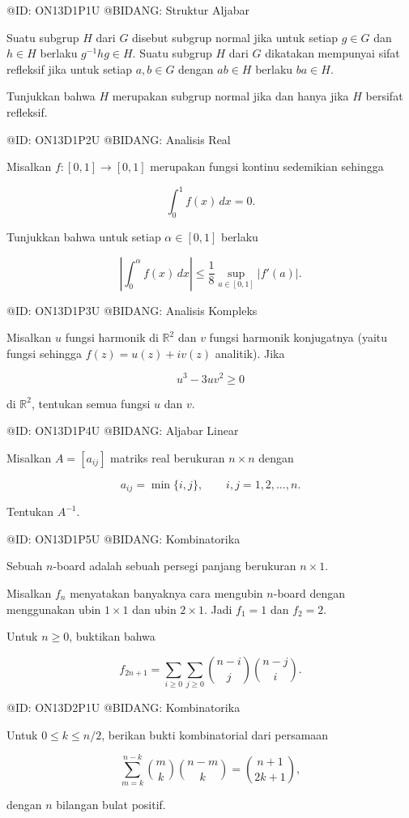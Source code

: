 @ID: ON13D1P1U
@BIDANG: Struktur Aljabar

Suatu subgrup $H$ dari $G$ disebut subgrup normal jika untuk setiap $g\in G$ dan $h\in H$ berlaku $g^{-1}hg\in H$. Suatu subgrup $H$ dari $G$ dikatakan mempunyai sifat refleksif jika untuk setiap $a,b\in G$ dengan $ab\in H$ berlaku $ba\in H$.

Tunjukkan bahwa $H$ merupakan subgrup normal jika dan hanya jika $H$ bersifat refleksif.

@ID: ON13D1P2U
@BIDANG: Analisis Real

Misalkan $f:[0,1]\to[0,1]$ merupakan fungsi kontinu sedemikian sehingga

$$
\int_0^1f(x)\,dx=0.
$$

Tunjukkan bahwa untuk setiap $\alpha\in[0,1]$ berlaku

$$
\left|
\int_0^\alpha f(x)\,dx
\right|
\le
\frac18
\sup_{a\in[0,1]}|f'(a)|.
$$

@ID: ON13D1P3U
@BIDANG: Analisis Kompleks

Misalkan $u$ fungsi harmonik di $\mathbb R^2$ dan $v$ fungsi harmonik konjugatnya (yaitu fungsi sehingga $f(z)=u(z)+iv(z)$ analitik). Jika

$$
u^3-3uv^2\ge0
$$

di $\mathbb R^2$, tentukan semua fungsi $u$ dan $v$.

@ID: ON13D1P4U
@BIDANG: Aljabar Linear

Misalkan $A=[a_{ij}]$ matriks real berukuran $n\times n$ dengan

$$
a_{ij}=\min\{i,j\},
\qquad i,j=1,2,\ldots,n.
$$

Tentukan $A^{-1}$.

@ID: ON13D1P5U
@BIDANG: Kombinatorika

Sebuah $n$-board adalah sebuah persegi panjang berukuran $n\times1$.

Misalkan $f_n$ menyatakan banyaknya cara mengubin $n$-board dengan menggunakan ubin $1\times1$ dan ubin $2\times1$. Jadi $f_1=1$ dan $f_2=2$.

Untuk $n\ge0$, buktikan bahwa

$$
f_{2n+1}
=
\sum_{i\ge0}\sum_{j\ge0}
\binom{n-i}{j}
\binom{n-j}{i}.
$$

@ID: ON13D2P1U
@BIDANG: Kombinatorika

Untuk $0\le k\le n/2$, berikan bukti kombinatorial dari persamaan

$$
\sum_{m=k}^{n-k}
\binom{m}{k}
\binom{n-m}{k}
=
\binom{n+1}{2k+1},
$$

dengan $n$ bilangan bulat positif.

